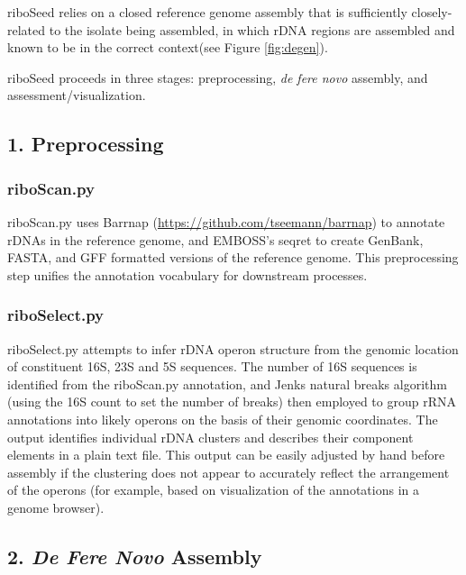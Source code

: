\documentclass[10pt]{article}
\begin{document}
\begin{linenumbers}
riboSeed relies on a closed reference genome assembly that is sufficiently closely-related to the isolate being assembled, in which rDNA regions are assembled and known to be in the correct context(see Figure \ref{fig:degen}).

riboSeed proceeds in three stages: preprocessing, \textit{de fere novo} assembly, and assessment/visualization.
\subsection*{1. Preprocessing}
\subsubsection*{riboScan.py}
riboScan.py uses Barrnap (\url{https://github.com/tseemann/barrnap}) to annotate rDNAs in the reference genome, and EMBOSS's seqret\cite{Rice2000a} to create GenBank, FASTA, and GFF formatted versions of the reference genome. This preprocessing step unifies the annotation vocabulary for downstream processes.

\subsubsection*{riboSelect.py}
riboSelect.py attempts to infer rDNA operon structure from the genomic location of constituent 16S, 23S and 5S sequences. The number of 16S sequences is identified from the riboScan.py annotation, and Jenks natural breaks algorithm (using the 16S count to set the number of breaks) then employed to group rRNA annotations into likely operons on the basis of  their genomic coordinates. The output identifies individual rDNA clusters and describes their component elements in a plain text file. This output can be easily adjusted by hand before assembly if the clustering does not appear to accurately reflect the arrangement of the operons (for example, based on visualization of the annotations in a genome browser).

\subsection*{2. \textit{De Fere Novo} Assembly}

\end{linenumbers}
\end{document}
